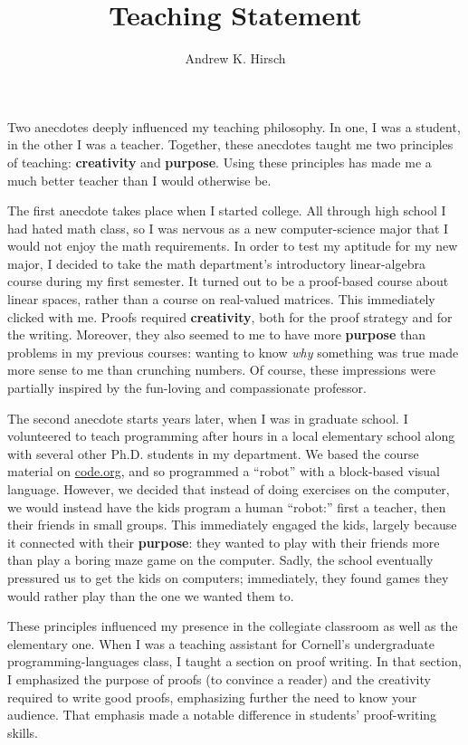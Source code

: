 \documentclass{article}
\author{Andrew K. Hirsch}
\title{Teaching Statement}
\date{}
\theoremstyle{definition}
\begin{document}
\maketitle

Two anecdotes deeply influenced my teaching philosophy.
In one, I was a student, in the other I was a teacher.
Together, these anecdotes taught me two principles of teaching: \textbf{creativity} and \textbf{purpose}.
Using these principles has made me a much better teacher than I would otherwise be.

The first anecdote takes place when I started college.
All through high school I had hated math class, so I was nervous as a new computer-science major that I would not enjoy the math requirements.
In order to test my aptitude for my new major, I decided to take the math department's introductory linear-algebra course during my first semester.
It turned out to be a proof-based course about linear spaces, rather than a course on real-valued matrices.
This immediately clicked with me.
Proofs required \textbf{creativity}, both for the proof strategy and for the writing.
Moreover, they also seemed to me to have more \textbf{purpose} than problems in my previous courses: wanting to know \emph{why} something was true made more sense to me than crunching numbers.
Of course, these impressions were partially inspired by the fun-loving and compassionate professor.

The second anecdote starts years later, when I was in graduate school.
I volunteered to teach programming after hours in a local elementary school along with several other Ph.D. students in my department.
We based the course material on \href{https://www.code.org}{code.org}, and so programmed a ``robot'' with a block-based visual language.
However, we decided that instead of doing exercises on the computer, we would instead have the kids program a human ``robot:'' first a teacher, then their friends in small groups.
This immediately engaged the kids, largely because it connected with their \textbf{purpose}: they wanted to play with their friends more than play a boring maze game on the computer.
Sadly, the school eventually pressured us to get the kids on computers; immediately, they found games they would rather play than the one we wanted them to.

These principles influenced my presence in the collegiate classroom as well as the elementary one.
When I was a teaching assistant for Cornell's undergraduate programming-languages class, I taught a section on proof writing.
In that section, I emphasized the purpose of proofs (to convince a reader) and the creativity required to write good proofs, emphasizing further the need to know your audience.
That emphasis made a notable difference in students' proof-writing skills.
\end{document}
